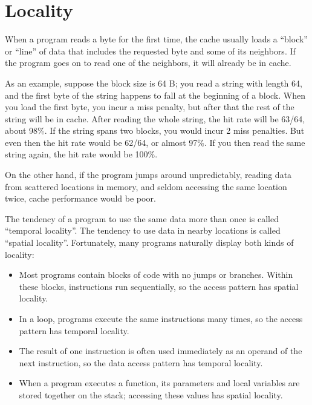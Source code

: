 \documentclass[12pt]{book}
\begin{document}
{\section{Locality}

When a program reads a byte for the first time, the cache usually
loads a ``block'' or ``line'' of data that includes the requested
byte and some of its neighbors.  If the program goes on to read one
of the neighbors, it will already be in cache.

As an example, suppose the block size is 64 B;
you read a string with length 64, and the first
byte of the string happens to fall at the beginning of a block.  When
you load the first byte, you incur a miss penalty, but
after that the rest of the string will be in cache.  After
reading the whole string, the hit rate will be 63/64, about 98\%.
If the string spans two blocks, you would incur 2 miss penalties.  But
even then the hit rate would be 62/64, or almost 97\%.  If you then
read the same string again, the hit rate would be 100\%.

On the other hand, if the program jumps around unpredictably,
reading data from scattered locations in memory, and seldom
accessing the same location twice, cache performance would be
poor.

The tendency of a program to use the same data more than once is
called ``temporal locality''.  The tendency to use data in nearby
locations is called ``spatial locality''.  Fortunately, many
programs naturally display both kinds of locality:

\begin{itemize}

\item Most programs contain blocks of code with no jumps or
branches.  Within these blocks, instructions run
sequentially, so the access pattern has
spatial locality.

\item In a loop, programs execute the same instructions many
times, so the access pattern has temporal locality.

\item The result of one instruction is often used immediately as
an operand of the next instruction, so the data access pattern
has temporal locality.

\item When a program executes a function, its parameters and local
variables are stored together on the stack; accessing these values
has spatial locality.


\end{itemize}}
\end{document}
